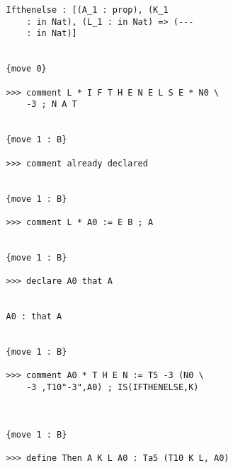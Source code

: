 \documentclass{article}
\begin{document}
\begin{verbatim}
   Ifthenelse : [(A_1 : prop), (K_1 
       : in Nat), (L_1 : in Nat) => (--- 
       : in Nat)]


   {move 0}

   >>> comment L * I F T H E N E L S E * N0 \
       -3 ; N A T


   {move 1 : B}

   >>> comment already declared


   {move 1 : B}

   >>> comment L * A0 := E B ; A


   {move 1 : B}

   >>> declare A0 that A


   A0 : that A


   {move 1 : B}

   >>> comment A0 * T H E N := T5 -3 (N0 \
       -3 ,T10"-3",A0) ; IS(IFTHENELSE,K)



   {move 1 : B}

   >>> define Then A K L A0 : Ta5 (T10 K L, A0)



\end{verbatim}
\end{document}

